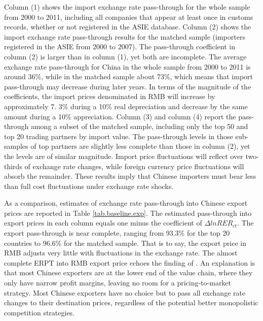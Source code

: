 Column (1) shows the import exchange rate pass-through for the whole sample from 2000 to 2011, including all companies that appear at least once in customs records, whether or not registered in the ASIE database. Column (2) shows the import exchange rate pass-through results for the matched sample (importers registered in the ASIE from 2000 to 2007). The pass-through coefficient in column (2) is larger than in column (1), yet both are incomplete. The average exchange rate pass-through for China in the whole sample from 2000 to 2011 is around 36\%, while in the matched sample about 73\%, which means that import pass-through may decrease during later years. In terms of the magnitude of the coefficients, the import prices denominated in RMB will increase by approximately 7. 3\% during a 10\% real depreciation and decrease by the same amount during a 10\% appreciation. Column (3) and column (4) report the pass-through among a subset of the matched sample, including only the top 50 and top 20 trading partners by import value. The pass-through levels in those sub-samples of top partners are slightly less complete than those in column (2), yet the levels are of similar magnitude. Import price fluctuations will reflect over two-thirds of exchange rate changes, while foreign currency price fluctuations will absorb the remainder. These results imply that Chinese importers must bear less than full cost fluctuations under exchange rate shocks. 

As a comparison, estimates of exchange rate pass-through into Chinese export prices are reported in Table \ref{tab.baseline.exp}. The estimated pass-through into export prices in each column equals one minus the coefficient of $\Delta lnRER_{ct}$. The export pass-through is near complete, ranging from 93.3\% for the top 20 countries to 96.6\% for the matched sample. That is to say, the export price in RMB adjusts very little with fluctuations in the exchange rate. The almost complete ERPT into RMB export price echoes the finding of \cite{lmx2015}. An explanation is that most Chinese exporters are at the lower end of the value chain, where they only have narrow profit margins, leaving no room for a pricing-to-market strategy. Most Chinese exporters have no choice but to pass all exchange rate changes to their destination prices, regardless of the potential better monopolistic competition strategies.

